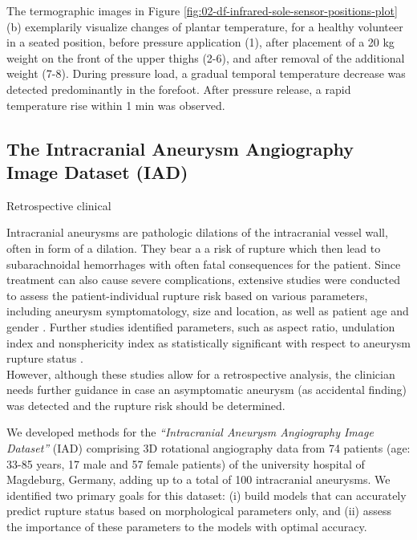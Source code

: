 \documentclass[
  oneside]{book}
\begin{document}
The termographic images in Figure \ref{fig:02-df-infrared-sole-sensor-positions-plot} (b) exemplarily visualize changes of plantar temperature, for a healthy volunteer in a seated position, before pressure application (1), after placement of a 20 kg weight on the front of the upper thighs (2-6), and after removal of the additional weight (7-8).
During pressure load, a gradual temporal temperature decrease was detected predominantly in the forefoot.
After pressure release, a rapid temperature rise within 1 min was observed.

\hypertarget{the-intracranial-aneurysm-angiography-image-dataset-iad}{%
\subsection{The Intracranial Aneurysm Angiography Image Dataset (IAD)}\label{the-intracranial-aneurysm-angiography-image-dataset-iad}}

Retrospective clinical

Intracranial aneurysms are pathologic dilations of the intracranial vessel wall, often in form of a dilation.
They bear a a risk of rupture which then lead to subarachnoidal hemorrhages with often fatal consequences for the patient.
Since treatment can also cause severe complications, extensive studies were conducted to assess the patient-individual rupture risk based on various parameters, including aneurysm symptomatology, size and location, as well as patient age and gender \autocite{Wermer2007}.
Further studies identified parameters, such as aspect ratio, undulation index and nonsphericity index as statistically significant with respect to aneurysm rupture status \autocite{Dhar2008,Xiang2011}.\\
However, although these studies allow for a retrospective analysis, the clinician needs further guidance in case an asymptomatic aneurysm (as accidental finding) was detected and the rupture risk should be determined.

We developed methods for the \emph{``Intracranial Aneurysm Angiography Image Dataset''} (IAD) comprising 3D rotational angiography data from 74 patients (age: 33-85 years, 17 male and 57 female patients) of the university hospital of Magdeburg, Germany, adding up to a total of 100 intracranial aneurysms.
We identified two primary goals for this dataset: (i) build models that can accurately predict rupture status based on morphological parameters only, and (ii) assess the importance of these parameters to the models with optimal accuracy.
\end{document}

